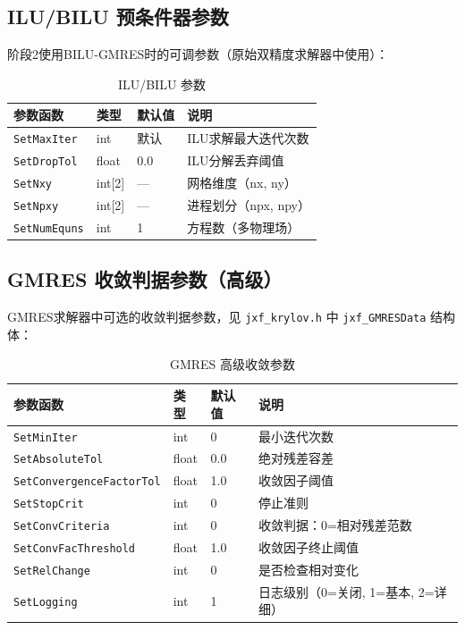 \documentclass[12pt,a4paper]{article}
\begin{document}
\subsection{ILU/BILU 预条件器参数}

阶段2使用BILU-GMRES时的可调参数（原始双精度求解器中使用）：

\begin{table}[htbp]
\centering
\caption{ILU/BILU 参数}
\label{tab:params_ilu}
\begin{tabular}{llll}
\toprule
参数函数 & 类型 & 默认值 & 说明 \\
\midrule
\texttt{SetMaxIter} & int & 默认 & ILU求解最大迭代次数 \\
\texttt{SetDropTol} & float & 0.0 & ILU分解丢弃阈值 \\
\texttt{SetNxy} & int[2] & --- & 网格维度（nx, ny） \\
\texttt{SetNpxy} & int[2] & --- & 进程划分（npx, npy） \\
\texttt{SetNumEquns} & int & 1 & 方程数（多物理场） \\
\bottomrule
\end{tabular}
\end{table}

\subsection{GMRES 收敛判据参数（高级）}

GMRES求解器中可选的收敛判据参数，见 \texttt{jxf\_krylov.h} 中 \texttt{jxf\_GMRESData} 结构体：

\begin{table}[htbp]
\centering
\caption{GMRES 高级收敛参数}
\label{tab:params_gmres_adv}
\begin{tabular}{llll}
\toprule
参数函数 & 类型 & 默认值 & 说明 \\
\midrule
\texttt{SetMinIter} & int & 0 & 最小迭代次数 \\
\texttt{SetAbsoluteTol} & float & 0.0 & 绝对残差容差 \\
\texttt{SetConvergenceFactorTol} & float & 1.0 & 收敛因子阈值 \\
\texttt{SetStopCrit} & int & 0 & 停止准则 \\
\texttt{SetConvCriteria} & int & 0 & 收敛判据：0=相对残差范数 \\
\texttt{SetConvFacThreshold} & float & 1.0 & 收敛因子终止阈值 \\
\texttt{SetRelChange} & int & 0 & 是否检查相对变化 \\
\texttt{SetLogging} & int & 1 & 日志级别（0=关闭, 1=基本, 2=详细） \\
\bottomrule
\end{tabular}
\end{table}
\end{document}
